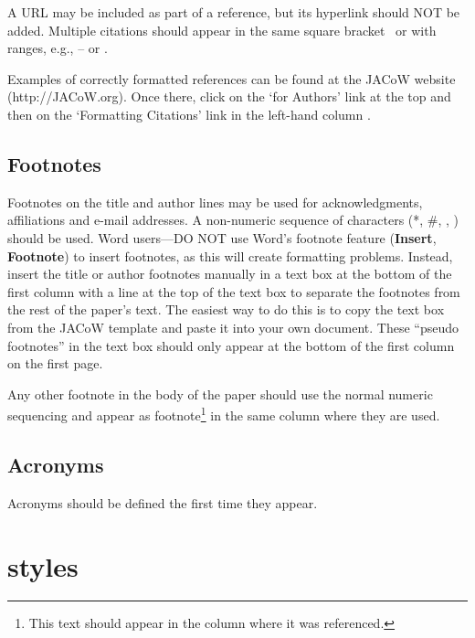 \documentclass[a4paper,
              ]{jacow}
\begin{document}
A URL may be included as part of a reference, but
its hyperlink should NOT be added. Multiple citations should appear in
the same square bracket~\cite{jacow-help, exampl-ref2, exampl-ref3} or
with ranges, e.g., \cite{jacow-help}--\cite{exampl-ref3} or \cite{jacow-help, exampl-ref, exampl-ref2, exampl-ref3, exampl-last}.

Examples of correctly formatted references can be found at the JACoW website (http://JACoW.org). Once there, click on the ‘for Authors’ link at the top and then on the ‘Formatting
Citations’ link in the left-hand column \cite{jacow-help}.

\subsection{Footnotes}

Footnotes on the title and author lines may be used for acknowledgments,
affiliations and e-mail addresses. A non-numeric sequence of characters (*, \#,
\dag, \ddag) should be used.
Word users---DO NOT use Word's footnote feature (\textbf{Insert}, \textbf{Footnote})
to insert footnotes, as this will create formatting problems. Instead, insert
the title or author footnotes manually in a text box at the bottom of the first column with a
line at the top of the text box to separate the footnotes from the rest of
the paper's text.  The easiest way to do this is to copy the text box from
the JACoW template and paste it into your own document.
These “pseudo footnotes” in the text box should only
appear at the bottom of the first column on the first page.

Any other footnote in the body of the paper should use the normal numeric
sequencing and appear as footnote\footnote{This text should appear
in the column where it was referenced.} in the same column where they are used.

\subsection{Acronyms}

Acronyms should be defined the first time they appear.

\section{styles}
\end{document}
